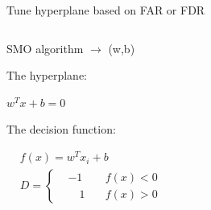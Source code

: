 \documentclass[10pt]{beamer}
\begin{document}
\begin{frame}{Tune hyperplane based on FAR or FDR}
 \begin{columns}
             \begin{column}{0.5\textwidth}
               SMO algorithm  $\rightarrow$ (w,b) \par
The hyperplane: \par
            $
             w^Tx+b = 0
            $  \par
 The decision function: \par
$
  \begin{aligned}
  & f(x) =  
 w^Tx_i+b  \\
  & D = \left\{
     \begin{aligned}
      &-1\quad &f(x)<0   \\
      &\quad 1    \quad &f(x)>0 
     \end{aligned}
  \right. 
    \end{aligned}
$
            

\end{column}
\end{columns}
\end{frame}
\end{document}
